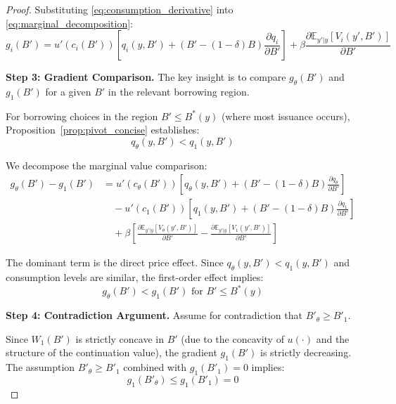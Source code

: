\documentclass[12pt]{article}
\theoremstyle{plain}
\begin{document}
\begin{proof}
	Substituting \eqref{eq:consumption_derivative} into
	\eqref{eq:marginal_decomposition}:
	\begin{equation}
		g_i(B') = u'(c_i(B')) \left[ q_i(y,B') + (B' - (1-\delta)B)\frac{\partial q_i}{\partial B'} \right] + \beta \frac{\partial \mathbb{E}_{y'|y}[V_i(y', B')]}{\partial B'} \label{eq:full_marginal_value}
	\end{equation}

	\textbf{Step 3: Gradient Comparison.} The key insight is to compare $g_\theta(B')$ and $g_1(B')$ for a given $B'$ in the relevant borrowing region.

	For borrowing choices in the region $B' \leq B^*(y)$ (where most issuance
	occurs), Proposition~\ref{prop:pivot_concise} establishes:
	\begin{equation}
		q_\theta(y, B') < q_1(y, B') \label{eq:price_ordering_delev}
	\end{equation}

	We decompose the marginal value comparison:
	\begin{align}
		g_\theta(B') - g_1(B') & = u'(c_\theta(B')) \left[ q_\theta(y,B') + (B' - (1-\delta)B)\frac{\partial q_\theta}{\partial B'} \right] \nonumber                                                                       \\
		                       & \quad - u'(c_1(B')) \left[ q_1(y,B') + (B' - (1-\delta)B)\frac{\partial q_1}{\partial B'} \right] \nonumber                                                                                \\
		                       & \quad + \beta \left[ \frac{\partial \mathbb{E}_{y'|y}[V_\theta(y', B')]}{\partial B'} - \frac{\partial \mathbb{E}_{y'|y}[V_1(y', B')]}{\partial B'} \right] \label{eq:gradient_difference}
	\end{align}

	The dominant term is the direct price effect. Since $q_\theta(y,B') <
		q_1(y,B')$ and consumption levels are similar, the first-order effect implies:
	\begin{equation}
		g_\theta(B') < g_1(B') \text{ for } B' \leq B^*(y) \label{eq:gradient_ordering}
	\end{equation}

	\textbf{Step 4: Contradiction Argument.} Assume for contradiction that $B'_\theta \geq B'_1$.

	Since $W_1(B')$ is strictly concave in $B'$ (due to the concavity of $u(\cdot)$
	and the structure of the continuation value), the gradient $g_1(B')$ is
	strictly decreasing. The assumption $B'_\theta \geq B'_1$ combined with
	$g_1(B'_1) = 0$ implies:
	\begin{equation}
		g_1(B'_\theta) \leq g_1(B'_1) = 0 \label{eq:baseline_gradient_nonpositive}
	\end{equation}


\end{proof}
\end{document}
